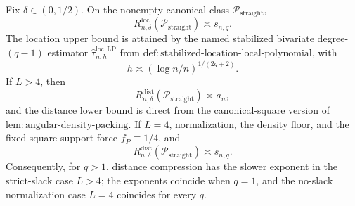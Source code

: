 Fix \(\delta\in(0,1/2)\).  On the nonempty canonical class \(\mathcal P_{\mathrm{straight}}\),
\[
 R_{n,\delta}^{\mathrm{loc}}(\mathcal P_{\mathrm{straight}})\asymp s_{n,q}.
\]
The location upper bound is attained by the named stabilized bivariate degree-\((q-1)\) estimator \(\widehat\tau^{\mathrm{loc},\mathrm{LP}}_{n,h}\) from \(\mathrm{def:stabilized\text{-}location\text{-}local\text{-}polynomial}\), with
\[
 h\asymp(\log n/n)^{1/(2q+2)}.
\]
If \(L>4\), then
\[
 R_{n,\delta}^{\mathrm{dist}}(\mathcal P_{\mathrm{straight}})\asymp a_n,
\]
and the distance lower bound is direct from the canonical-square version of \(\mathrm{lem:angular\text{-}density\text{-}packing}\).  If \(L=4\), normalization, the density floor, and the fixed square support force \(f_P\equiv1/4\), and
\[
 R_{n,\delta}^{\mathrm{dist}}(\mathcal P_{\mathrm{straight}})\asymp s_{n,q}.
\]
Consequently, for \(q>1\), distance compression has the slower exponent in the strict-slack case \(L>4\); the exponents coincide when \(q=1\), and the no-slack normalization case \(L=4\) coincides for every \(q\).